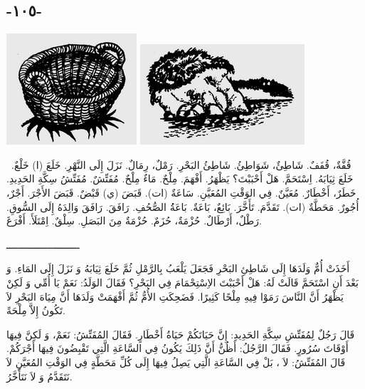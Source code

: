 \documentclass[a5paper]{article}
\begin{document}
\subsection[-١٠٥-]{-١٠٥-}
 \includegraphics[width=1.9063in,height=1.6252in]{images/MuhammadBagauddinprettified-img278.png}   \includegraphics[width=2.4063in,height=1.4689in]{images/MuhammadBagauddinprettified-img279.png} 

\ قُفَّةٌ، قُفَفٌ. شَاطِئٌ، شَوَاطِئُ. شَاطِئُ البَحْرِ. رَمْلٌ، رِمَالٌ. نَزَلَ إِلَى النَّهْرِ. خَلَعَ (ا) خَلْعٌ. خَلَعَ ثِيَابَهُ. اِسْتَحَمَّ. هَلْ أَحْبَبْتَ؟ يَظْهَرُ. أَفْهَمَ. مِلْحٌ. مَاءٌ مِلْحٌ. مُفَتِّشٌ. مُفَتِّشُ سِكَّةِ الحَدِيدِ. خَطَرٌ، أَخْطَارٌ. مُعَيَّنٌ. فِي الوَقْتِ المُعَيَّنِ. سَاعَةٌ (ات). قَبَضَ (ي) قَبْضٌ. قَبَضَ الأَجْرَ. أَجْرٌ، أُجُورٌ. مَحَطَّةٌ (ات). تَقَدَّمَ. تَأَخَّرَ. بَائِعٌ، بَاعَةٌ. بَاعَةُُ الصُّحُفِ. رَافَقَ. رَافَقَ وَالِدَهُ إِلَى السُّوقِ. رَطْلٌ، أَرْطَالٌ. حُزْمَةٌ، حُزَمٌ. حُزْمَةٌ مِنَ البَصَلِ. سِلْقٌ. اِمْتَلَأَ. أَفْرَغَ.

ـــــــــــــــــــــــــ

أَخَذَتْ أُمٌّ وَلَدَهَا إِلَى شَاطِئِ البَحْرِ فَجَعَلَ يَلْعَبُ بِالرَّمْلِ ثُمَّ خَلَعَ ثِيَابَهُ وَ نَزَلَ إِلَى المَاءِ. وَ بَعْدَ أَنِ اسْتَحَمَّ قَالَتْ لَهُ: هَلْ أَحْبَبْتَ الاِسْتِحْمَامَ فِي البَحْرِ؟ فَقَالَ الوَلَدُ: نَعَمْ يَا أُمِّي وَ لَكِنْ يَظْهَرُ أَنَّ النَّاسَ رَمَوْا فِيهِ مِلْحًا كَثِيرًا. فَضَحِكَتِ الأُمُّ ثُمَّ أَفْهَمَتْ وَلَدَهَا أَنَّ مِيَاهَ البَحْرِ لاَ تَكُونُ إِلاَّ مِلْحَةً.

قَالَ رَجُلٌ لِمُفَتِّشِ سِكَّةِ الحَدِيدِ: إِنَّ حَيَاتَكُمْ حَيَاةُ أَخْطَارٍ. فَقَالَ المُفَتِّشُ: نَعَمْ، وَ لَكِنَّ فِيهَا أَوْقَاتَ سُرُورٍ. فَقَالَ الرَّجُلُ: أَظُنُّ أَنَّ ذَلِكَ يَكُونُ فِي السَّاعَةِ الَّتِي تَقْبِضُونَ فِيهَا أَجْرَكُمْ. قَالَ المُفَتِّشُ: لاَ ، بَلْ فِي السَّاعَةِ الَّتِي يَصِلُ فِيهَا إِلَى كُلِّ مَحَطَّةٍ فِي الوَقْتِ المُعَيَّنِ لاَ نَتَقَدَّمُ وَ لاَ نَتَأَخَّرُ.
\end{document}
